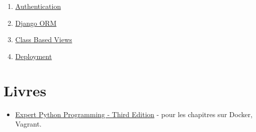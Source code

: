\documentclass[11pt]{amsbook}
\begin{document}
\begin{enumerate}
\begin{enumerate}
\item{\href{https://simpleisbetterthancomplex.com/series/2017/09/25/a-complete-beginners-guide-to-django-part-4.html}{Authentication}}

\item{\href{https://simpleisbetterthancomplex.com/series/2017/10/02/a-complete-beginners-guide-to-django-part-5.html}{Django ORM}}

\item{\href{https://simpleisbetterthancomplex.com/series/2017/10/09/a-complete-beginners-guide-to-django-part-6.html}{Class Based Views}}

\item{\href{https://simpleisbetterthancomplex.com/series/2017/10/16/a-complete-beginners-guide-to-django-part-7.html}{Deployment}}

\end{enumerate}

\end{enumerate}


\hypertarget{x-livres}{\chapter{Livres}}
\begin{itemize}

\item \href{https://www.packtpub.com/product/expert-python-programming-third-edition/9781789808896}{Expert Python Programming - Third Edition} - pour les chapitres sur Docker, Vagrant.

\end{itemize}
\end{document}
